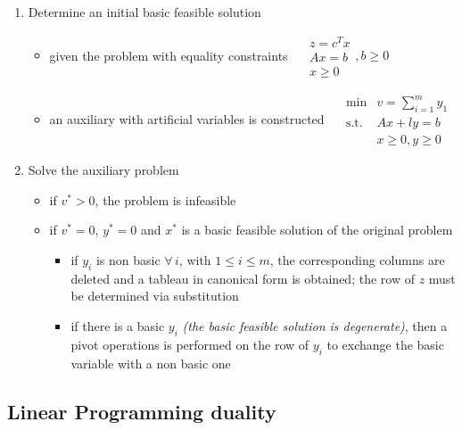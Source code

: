 \documentclass[english]{article}
\begin{document}
\begin{enumerate}[label=phase \arabic*:, ref=phase \arabic*, leftmargin=*, labelindent=1em, widest*=8]
  \item Determine an initial basic feasible solution
        \begin{itemize}
          \item given the problem with equality constraints
                \(\quad \begin{matrix}
                  z = c^T x \\
                  Ax = b    \\
                  x \geq 0
                \end{matrix}, b \geq 0\)
          \item an auxiliary \LP with artificial variables is constructed
                \(\quad \begin{matrix}
                  \min        & v = \displaystyle \sum_{i=1}^m y_1 \\
                  \text{s.t.} & Ax + ly = b                        \\
                              & x \geq 0, y \geq 0
                \end{matrix}\)
        \end{itemize}
  \item Solve the auxiliary problem
        \begin{itemize}
          \item if \(v^\ast > 0\), the problem is infeasible
          \item if \(v^\ast = 0\), \(y^\ast = 0\) and \(x^\ast\) is a basic feasible solution of the original problem
                \begin{itemize}
                  \item if \(y_i\) is non basic \(\forall \, i\), with \(1 \leq i \leq m\), the corresponding columns are deleted and a tableau in canonical form is obtained; the row of \(z\) must be determined via substitution
                  \item if there is a basic \(y_i\) \textit{(the basic feasible solution is degenerate)}, then a pivot operations is performed on the row of \(y_i\) to exchange the basic variable with a non basic one
                \end{itemize}
        \end{itemize}
\end{enumerate}

\subsection{Linear Programming duality}
\end{document}
